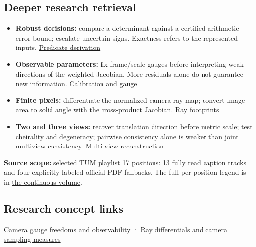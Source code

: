 \subsection{Deeper research retrieval}\label{deeper-research-retrieval}

\begin{itemize}
\tightlist
\item
  \textbf{Robust decisions:} compare a determinant against a certified arithmetic error bound; escalate uncertain signs. Exactness refers to the represented inputs. \href{Continuous\%20Notes/Computing\%20Foundations\%20-\%20From\%20Bits\%20to\%20C++\%20and\%20Systems\%20APIs\#A\%20sign\%20can\%20matter\%20more\%20than\%20a\%20coordinate:\%20robust\%20predicates}{Predicate derivation}
\item
  \textbf{Observable parameters:} fix frame/scale gauges before interpreting weak directions of the weighted Jacobian. More residuals alone do not guarantee new information. \href{Continuous\%20Notes/Computing\%20Foundations\%20-\%20From\%20Bits\%20to\%20C++\%20and\%20Systems\%20APIs\#Calibration\%20needs\%20informative\%20observations\%20and\%20a\%20fixed\%20gauge}{Calibration and gauge}
\item
  \textbf{Finite pixels:} differentiate the normalized camera-ray map; convert image area to solid angle with the cross-product Jacobian. \href{Continuous\%20Notes/Computing\%20Foundations\%20-\%20From\%20Bits\%20to\%20C++\%20and\%20Systems\%20APIs\#A\%20camera\%20ray\%20carries\%20a\%20pixel\%20footprint}{Ray footprints}
\item
  \textbf{Two and three views:} recover translation direction before metric scale; test cheirality and degeneracy; pairwise consistency alone is weaker than joint multiview consistency. \href{Continuous\%20Notes/Computing\%20Foundations\%20-\%20From\%20Bits\%20to\%20C++\%20and\%20Systems\%20APIs\#Calibrated\%20two-view\%20geometry:\%20direction\%20before\%20distance}{Multi-view reconstruction}
\end{itemize}

\textbf{Source scope:} selected TUM playlist 17 positions: 13 fully read caption tracks and four explicitly labeled official-PDF fallbacks. The full per-position legend is in \href{Continuous\%20Notes/Computing\%20Foundations\%20-\%20From\%20Bits\%20to\%20C++\%20and\%20Systems\%20APIs\#External\%20course\%20legend\%20and\%20evidence\%20boundary}{the continuous volume}.

\subsection{Research concept links}\label{research-concept-links}

\hyperref[appendix-113f0267e5f4]{Camera gauge freedoms and observability} · \hyperref[appendix-8c40fad29462]{Ray differentials and camera sampling measures}

